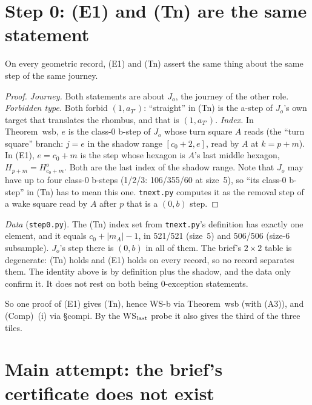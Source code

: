 \documentclass[11pt]{article}
\theoremstyle{definition}\newtheorem{definition}[theorem]{Definition}\newtheorem{remark}[theorem]{Remark}
\begin{document}
\section{Step 0: (E1) and (Tn) are the same statement}\label{sec:step0}
\begin{proposition}\label{prop:same}
On every geometric record, (E1) and (Tn) assert the same thing about the same step of the same journey.
\end{proposition}
\begin{proof}
\emph{Journey.} Both statements are about $J_o$, the journey of the other role.
\emph{Forbidden type.} Both forbid $(1,a_{T'})$: ``straight'' in (Tn) is the a-step of $J_o$'s own target that translates the rhombus, and that is $(1,a_{T'})$.
\emph{Index.} In Theorem~wsb, $e$ is the class-0 b-step of $J_o$ whose turn square $A$ reads (the ``turn square'' branch: $j=e$ in the shadow range $[c_0+2,e]$, read by $A$ at $k=p+m$). In (E1), $e=c_0+m$ is the step whose hexagon is $A$'s last middle hexagon, $H_{p+m}=H^o_{c_0+m}$. Both are the last index of the shadow range. Note that $J_o$ may have up to four class-0 b-steps (1/2/3: 106/355/60 at size~5), so ``its class-0 b-step'' in (Tn) has to mean this one. \texttt{tnext.py} computes it as the removal step of a wake square read by $A$ after $p$ that is a $(0,b)$ step.
\end{proof}
\noindent\emph{Data} (\texttt{step0.py}). The (Tn) index set from \texttt{tnext.py}'s definition has exactly one element, and it equals $c_0+|m_A|-1$, in 521/521 (size~5) and 506/506 (size-6 subsample). $J_o$'s step there is $(0,b)$ in all of them. The brief's $2\times2$ table is degenerate: (Tn) holds and (E1) holds on every record, so no record separates them. The identity above is by definition plus the shadow, and the data only confirm it. It does not rest on both being 0-exception statements.

So one proof of (E1) gives (Tn), hence WS-b via Theorem~wsb (with (A3)), and (Comp)~(i) via \S compi. By the WS$_{\rm last}$ probe it also gives the third of the three tiles.

\section{Main attempt: the brief's certificate does not exist}\label{sec:neg}
\end{document}
